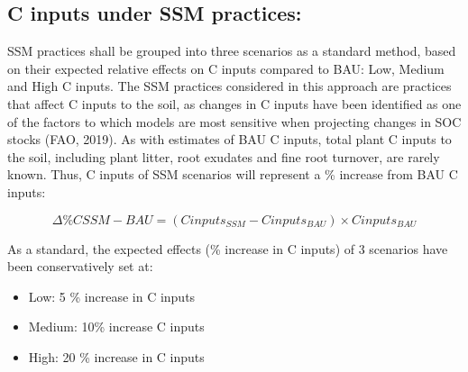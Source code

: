 \documentclass[
  10pt,
  b5paper,
]{book}
\providecommand{\tightlist}{%
  \setlength{\itemsep}{0pt}\setlength{\parskip}{0pt}}
\begin{document}
\hypertarget{c-inputs-under-ssm-practices}{%
\subsection{C inputs under SSM practices:}\label{c-inputs-under-ssm-practices}}

SSM practices shall be grouped into three scenarios as a standard method, based on their expected relative effects on C inputs compared to BAU: Low, Medium and High C inputs. The SSM practices considered in this approach are practices that affect C inputs to the soil, as changes in C inputs have been identified as one of the factors to which models are most sensitive when projecting changes in SOC stocks (FAO, 2019).
As with estimates of BAU C inputs, total plant C inputs to the soil, including plant litter, root exudates and fine root turnover, are rarely known. Thus, C inputs of SSM scenarios will represent a \% increase from BAU C inputs:

\begin{equation}
\tag{6.13}
	\Delta \% CSSM-BAU = (Cinputs_{SSM} - Cinputs_{BAU}) \times Cinputs_{BAU}
\end{equation}

As a standard, the expected effects (\% increase in C inputs) of 3 scenarios have been conservatively set at:

\begin{itemize}
\tightlist
\item
  Low: 5 \% increase in C inputs
\item
  Medium: 10\% increase C inputs
\item
  High: 20 \% increase in C inputs
\end{itemize}
\end{document}
